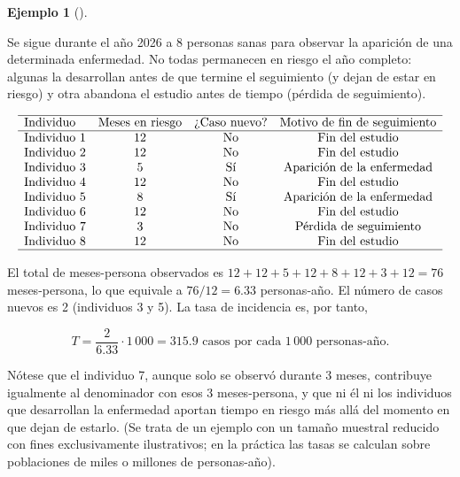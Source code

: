 \documentclass[
  spanish,
  a4paper,
]{scrreport}
\theoremstyle{definition}
\newtheorem{example}{Ejemplo}[chapter]
\theoremstyle{definition}
\theoremstyle{remark}
\begin{document}
\begin{example}[]\protect\hypertarget{exm-descriptivos-tasa-incidencia}{}\label{exm-descriptivos-tasa-incidencia}

Se sigue durante el año 2026 a 8 personas sanas para observar la
aparición de una determinada enfermedad. No todas permanecen en riesgo
el año completo: algunas la desarrollan antes de que termine el
seguimiento (y dejan de estar en riesgo) y otra abandona el estudio
antes de tiempo (pérdida de seguimiento).

\[
\begin{array}{lccc}
\hline
\mbox{Individuo} & \mbox{Meses en riesgo} & \mbox{¿Caso nuevo?} & \mbox{Motivo de fin de seguimiento}\\
\hline
\mbox{Individuo 1} & 12 & \mbox{No} & \mbox{Fin del estudio}\\
\mbox{Individuo 2} & 12 & \mbox{No} & \mbox{Fin del estudio}\\
\mbox{Individuo 3} & 5  & \mbox{Sí} & \mbox{Aparición de la enfermedad}\\
\mbox{Individuo 4} & 12 & \mbox{No} & \mbox{Fin del estudio}\\
\mbox{Individuo 5} & 8  & \mbox{Sí} & \mbox{Aparición de la enfermedad}\\
\mbox{Individuo 6} & 12 & \mbox{No} & \mbox{Fin del estudio}\\
\mbox{Individuo 7} & 3  & \mbox{No} & \mbox{Pérdida de seguimiento}\\
\mbox{Individuo 8} & 12 & \mbox{No} & \mbox{Fin del estudio}\\
\hline
\end{array}
\]

El total de meses-persona observados es \(12+12+5+12+8+12+3+12=76\)
meses-persona, lo que equivale a \(76/12=6.33\) personas-año. El número
de casos nuevos es 2 (individuos 3 y 5). La tasa de incidencia es, por
tanto,

\[
T = \frac{2}{6.33}\cdot 1\,000 = 315.9 \mbox{ casos por cada } 1\,000 \mbox{ personas-año}.
\]

Nótese que el individuo 7, aunque solo se observó durante 3 meses,
contribuye igualmente al denominador con esos 3 meses-persona, y que ni
él ni los individuos que desarrollan la enfermedad aportan tiempo en
riesgo más allá del momento en que dejan de estarlo. (Se trata de un
ejemplo con un tamaño muestral reducido con fines exclusivamente
ilustrativos; en la práctica las tasas se calculan sobre poblaciones de
miles o millones de personas-año).

\end{example}
\end{document}
